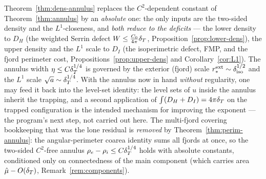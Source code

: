 \begin{remark}
\label{rem:loop}
Theorem~\ref{thm:dens-annulus} replaces the $C^2$-dependent constant of
Theorem~\ref{thm:annulus} by an \emph{absolute} one: the only inputs are
the two-sided density and the $L^1$-closeness, and \emph{both reduce to the
deficits} --- the lower density to $D_H$ (the weighted Serrin defect $W\le
\tfrac{C_0}{4\pi}\delta_T$, Proposition~\ref{prop:lower-dens}), the upper density
and the $L^1$ scale to $D_I$ (the isoperimetric defect, FMP, and the fjord
perimeter cost, Propositions~\ref{prop:upper-dens} and
Corollary~\ref{cor:L1}). The annulus width $\eta\le C\delta_T^{1/4}$ is governed
by the exterior (fjord) scale $r_*^{\mathrm{ext}}\sim\delta_{\mathrm{iso}}^{1/2}$ and the
$L^1$ scale $\sqrt a\sim\delta_T^{1/4}$. With the annulus now in hand
\emph{without} regularity, one may feed it back into the level-set identity:
the level sets of $u$ inside the annulus inherit the trapping, and a second
application of $\int(D_H+D_I)=4\pi\delta_T$ on the trapped configuration is the
intended mechanism for improving the exponent --- the program's next step,
not carried out here. The multi-fjord covering bookkeeping that was the lone
residual is \emph{removed} by Theorem~\ref{thm:perim-annulus}: the
angular-perimeter coarea identity sums all fjords at once, so the two-sided
$C^2$-free annulus $\rho_e-\rho_i\le C\delta_T^{1/4}$ holds with absolute
constants, conditioned only on connectedness of the main component (which
carries area $\hat\mu-O(\delta_T)$, Remark~\ref{rem:components}).
\end{remark}

